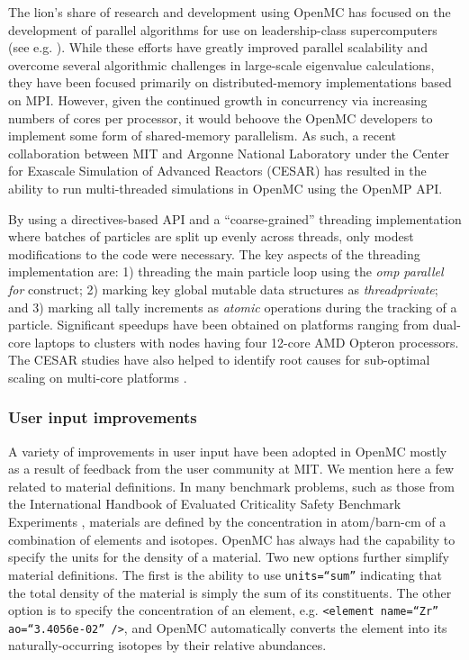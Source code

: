 \documentclass{ansconf}
\begin{document}
The lion's share of research and development using OpenMC has focused on the
development of parallel algorithms for use on leadership-class supercomputers
(see e.g. \cite{nse-romano-2012, ane-romano-2013, trans-romano-2012}). While
these efforts have greatly improved parallel scalability and overcome several
algorithmic challenges in large-scale eigenvalue calculations, they have been
focused primarily on distributed-memory implementations based on MPI. However,
given the continued growth in concurrency via increasing numbers of cores per
processor, it would behoove the OpenMC developers to implement some form of
shared-memory parallelism. As such, a recent collaboration between MIT and
Argonne National Laboratory under the Center for Exascale Simulation of Advanced
Reactors (CESAR) has resulted in the ability to run multi-threaded simulations
in OpenMC using the OpenMP API.

By using a directives-based API and a ``coarse-grained'' threading
implementation where batches of particles are split up evenly across threads,
only modest modifications to the code were necessary. The key aspects of the
threading implementation are: 1) threading the main particle loop using the
\emph{omp parallel for} construct; 2) marking key global mutable data structures
as \emph{threadprivate}; and 3) marking all tally increments as \emph{atomic}
operations during the tracking of a particle. Significant speedups have been
obtained on platforms ranging from dual-core laptops to clusters with nodes
having four 12-core AMD Opteron processors. The CESAR studies have also helped
to identify root causes for sub-optimal scaling on multi-core platforms
\cite{ijhpca-siegel-2012}.

\subsubsection{User input improvements}

A variety of improvements in user input have been adopted in OpenMC mostly as a
result of feedback from the user community at MIT. We mention here a few related
to material definitions. In many benchmark problems, such as those from the
International Handbook of Evaluated Criticality Safety Benchmark Experiments
\cite{icsbep-2009}, materials are defined by the concentration in atom/barn-cm
of a combination of elements and isotopes. OpenMC has always had the capability
to specify the units for the density of a material. Two new options further
simplify material definitions. The first is the ability to use
\texttt{units=``sum''} indicating that the total density of the material is
simply the sum of its constituents. The other option is to specify the
concentration of an element, e.g. \texttt{<element name=``Zr'' ao=``3.4056e-02''
  />}, and OpenMC automatically converts the element into its
naturally-occurring isotopes by their relative abundances.
\end{document}
